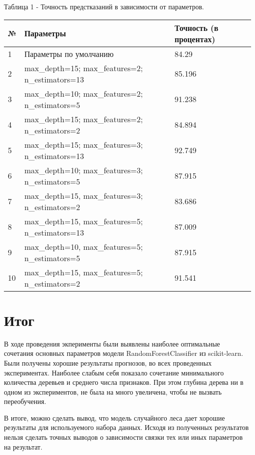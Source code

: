 \documentclass[a4paper,12pt]{article}
\begin{document}
	\vspace{0.5cm}
	Таблица 1 - Точность предстказаний в зависимости от параметров.
\begin{longtable}{|p{1cm}|p{9cm}|p{3cm}|}
\hline
№ & Параметры & Точность (в процентах) \\ 
\hline 
1 & Параметры по умолчанию & 84.29 \\
\hline
2 & max\_depth=15; max\_features=2; n\_estimators=13 & 85.196 \\
\hline 
3 & max\_depth=10; max\_features=2; n\_estimators=5 & 91.238 \\
\hline 
4 & max\_depth=15; max\_features=2; n\_estimators=2 & 84.894 \\
\hline 
5 & max\_depth=15; max\_features=3; n\_estimators=13 & 92.749 \\
\hline
6 & max\_depth=10; max\_features=3; n\_estimators=5 & 87.915 \\
\hline  
7 & max\_depth=15, max\_features=3; n\_estimators=2 & 83.686 \\
\hline
8 & max\_depth=15, max\_features=5; n\_estimators=13 & 87.009\\
\hline 
9 & max\_depth=10, max\_features=5; n\_estimators=5 & 87.915 \\
\hline
10 & max\_depth=15, max\_features=5; n\_estimators=2 & 91.541 \\
\hline
\end{longtable}


\newpage\section{Итог}
	В ходе проведения экперименты были выявлены наиболее оптимальные сочетания основных параметров модели RandomForestClassifier из scikit-learn. Были получены хорошие результаты прогнозов, во всех проведенных экспериментах. Наиболее слабым себя показало сочетание минимального количества деревьев и среднего числа признаков. При этом глубина дерева ни в одном из экспериментов, не была на много увеличена, чтобы не вызвать переобучения. 
	
	\vspace{0.5cm}
	В итоге, можно сделать вывод, что модель случайного леса дает хорошие результаты для используемого набора данных. Исходя из полученных результатов нельзя сделать точных выводов о зависимости связки тех или иных параметров на результат.
	
	
\end{document}
